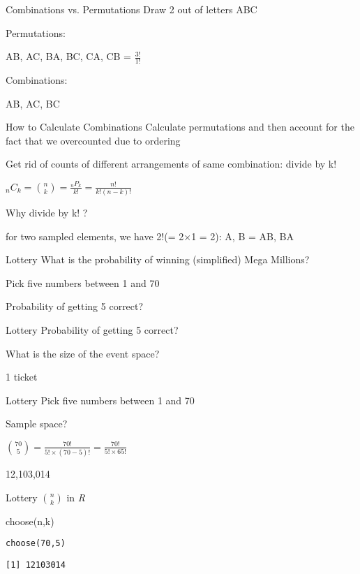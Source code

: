 \documentclass[presentation]{beamer}
\begin{document}
\begin{frame}[label={sec:orga0f44fe}]{Combinations vs. Permutations}
Draw 2 out of letters ABC

Permutations:
\pause

AB, AC, BA, BC, CA, CB =  \(\frac{3!}{1!}\)

Combinations:

\pause

AB, AC, BC
\end{frame}

\begin{frame}[label={sec:orgf3563c3}]{How to Calculate Combinations}
Calculate permutations and then account for the fact that we overcounted due to ordering

Get rid of counts of different arrangements of same combination: divide by k!

\(_{n}C_{k} = {n \choose k} = \frac{_{n}P_{k}}{k!} = \frac{n!}{k!(n-k)!}\)


\pause
Why divide by k! ?

\pause
for two sampled elements, we have 2!(= 2×1 = 2): A, B = AB, BA
\end{frame}


\begin{frame}[label={sec:orgb4f8e4f}]{Lottery}
What is the probability of winning (simplified) Mega Millions?

Pick five numbers between 1 and 70

Probability of getting 5 correct?
\end{frame}


\begin{frame}[label={sec:orgc32eab6}]{Lottery}
Probability of getting 5 correct?

What is the size of the event space?

\pause

1 ticket
\end{frame}


\begin{frame}[label={sec:orgcffcb82}]{Lottery}
Pick five numbers between 1 and 70

Sample space?

\pause

\({70 \choose 5} = \frac{70!}{5! \times (70-5)!} =  \frac{70!}{5! \times 65!}\)


\pause

12,103,014
\end{frame}

\begin{frame}[fragile,label={sec:orgccd6276}]{Lottery}
 \({n \choose k}\) in \emph{R}

choose(n,k)

\begin{verbatim}
choose(70,5)
\end{verbatim}

\begin{verbatim}
[1] 12103014
\end{verbatim}
\end{frame}
\end{document}
